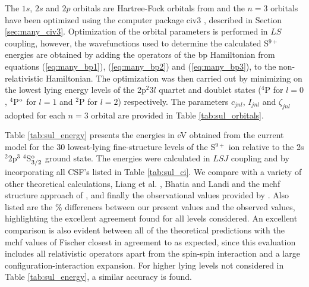 The $1s$, $2s$ and $2p$ orbitals are Hartree-Fock orbitals from \citet{1974ADNDT..14..177C} and the $n=3$ orbitals have been optimized using the computer package {\sc civ3} \cite{1975CoPhC...9..141H}, described in Section \ref{sec:many_civ3}. Optimization of the orbital parameters is performed in $LS$ coupling, however, the wavefunctions used to determine the calculated S$^{9+}$ energies are obtained by adding the operators of the {\sc bp} Hamiltonian from equations (\ref{eq:many_bp1}), (\ref{eq:many_bp2}) and (\ref{eq:many_bp3}), to the non-relativistic Hamiltonian. The optimization was then carried out by minimizing on the lowest lying energy levels of the 2p$^2$3$l$ quartet and doublet states ($^4$P for $l=0$, $^4$P$^{\rm o}$ for $l=1$ and $^2$P for $l=2$) respectively. The parameters $c_{jnl}$, $I_{jnl}$ and $\zeta_{jnl}$ adopted for each $n = 3$ orbital are provided in Table \ref{tab:sul_orbitals}.

Table \ref{tab:sul_energy} presents the energies in eV obtained from the current model for the 30 lowest-lying fine-structure levels of the S$^{9+}$ ion relative to the 2s$^{2}$2p$^{3}$ $^{4}$S$^{\rm{o}}_{3/2}$ ground state. The energies were calculated in $LSJ$ coupling and by incorporating all CSF's listed in Table \ref{tab:sul_ci}. We compare with a variety of other theoretical calculations, Liang et al. \cite{2011A&A...533A..87L}, Bhatia and Landi \cite{2003ADNDT..85..169B} and the {\sc mchf} structure approach of \citet{2004ADNDT..87....1F}, and finally the observational values provided by \citet{1990JPCRD..19..821M}. Also listed are the \% differences between our present values and the observed values, highlighting the excellent agreement found for all levels considered. An excellent comparison is also evident between all of the theoretical predictions with the {\sc mchf} values of Fischer closest in agreement to \citet{1990JPCRD..19..821M} as expected, since this evaluation includes all relativistic operators apart from the spin-spin interaction and a large configuration-interaction expansion. For higher lying levels not considered in Table \ref{tab:sul_energy}, a similar accuracy is found. 

